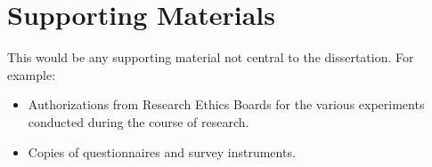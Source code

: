 \chapter{Supporting Materials}

This would be any supporting material not central to the dissertation.
For example:
\begin{itemize}
\item Authorizations from Research Ethics Boards for the various
    experiments conducted during the course of research.
\item Copies of questionnaires and survey instruments.
\end{itemize}